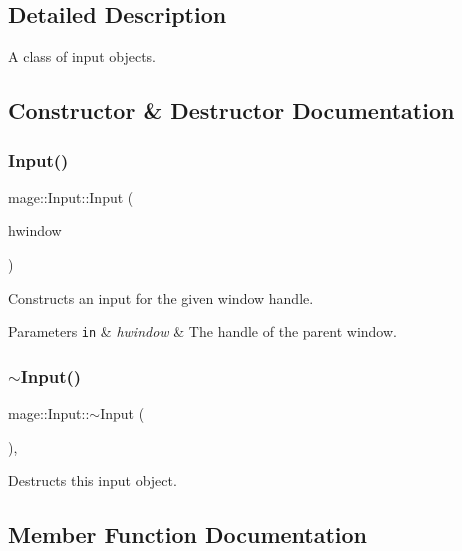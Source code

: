 \subsection{Detailed Description}
A class of input objects. 

\subsection{Constructor \& Destructor Documentation}
\hypertarget{classmage_1_1_input_a036b38f787b45d14ff92f360303b33af}{}\label{classmage_1_1_input_a036b38f787b45d14ff92f360303b33af} 
\subsubsection{\texorpdfstring{Input()}{Input()}}
{\footnotesize\ttfamily mage\+::\+Input\+::\+Input (\begin{DoxyParamCaption}\item[{H\+W\+ND}]{hwindow }\end{DoxyParamCaption})\hspace{0.3cm}{\ttfamily [protected]}}

Constructs an input for the given window handle.


\begin{DoxyParams}[1]{Parameters}
\mbox{\tt in}  & {\em hwindow} & The handle of the parent window. \\
\hline
\end{DoxyParams}
\hypertarget{classmage_1_1_input_add0881945eee81e9a2bee7fe677c96fb}{}\label{classmage_1_1_input_add0881945eee81e9a2bee7fe677c96fb} 
\subsubsection{\texorpdfstring{$\sim$\+Input()}{~Input()}}
{\footnotesize\ttfamily mage\+::\+Input\+::$\sim$\+Input (\begin{DoxyParamCaption}{ }\end{DoxyParamCaption})\hspace{0.3cm}{\ttfamily [protected]}, {\ttfamily [virtual]}}

Destructs this input object. 

\subsection{Member Function Documentation}
\hypertarget{classmage_1_1_input_a59c042bc18b47bca3010eb4df7de44c2}{}\label{classmage_1_1_input_a59c042bc18b47bca3010eb4df7de44c2} 
